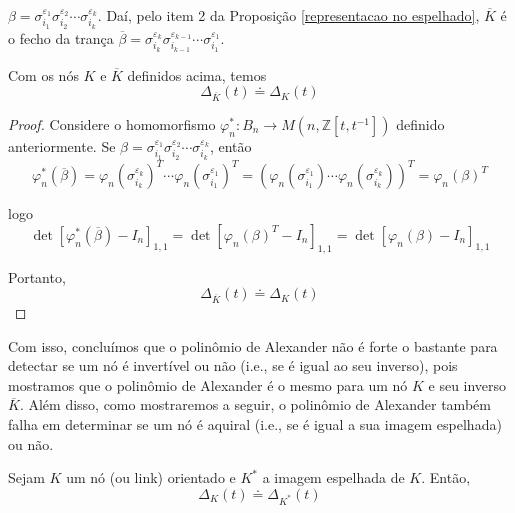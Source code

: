 	$\beta = \sigma_{i_1}^{\varepsilon_1}\sigma_{i_2}^{\varepsilon_2}\cdots\sigma_{i_k}^{\varepsilon_k}$. Daí, pelo item 2 da Proposição \eqref{representacao no espelhado}, $\overline{K}$ é o fecho da trança $\overline{\beta} = \sigma_{i_k}^{\varepsilon_k}\sigma_{i_{k-1}}^{\varepsilon_{k-1}}\cdots\sigma_{i_1}^{\varepsilon_1}$. 
	\begin{prop}
		\label{polinomio de Alexander para nos invertidos}
		Com os nós $K$ e $\overline{K}$ definidos acima, temos
		\begin{equation*}
		\Delta_{\overline{K}}(t) \doteq \Delta_K(t)
		\end{equation*}
	\end{prop}
	\begin{proof}
		Considere o homomorfismo $\varphi_n^\ast: B_n\to M(n, \mathbb{Z}[t,t^{-1}])$ definido anteriormente. Se $\beta=\sigma_{i_1}^{\varepsilon_1}\sigma_{i_2}^{\varepsilon_2}\cdots\sigma_{i_k}^{\varepsilon_k}$, então
		\begin{equation*}
		\varphi_n^\ast(\overline{\beta}) = \varphi_n(\sigma_{i_k}^{\varepsilon_k})^T\cdots\varphi_n(\sigma_{i_1}^{\varepsilon_1})^T = (\varphi_n(\sigma_{i_1}^{\varepsilon_1})\cdots\varphi_n(\sigma_{i_k}^{\varepsilon_k}))^T = \varphi_n(\beta)^T
		\end{equation*}
		
		\par\vspace{0.3cm} logo
		\begin{equation*}
		\det[\varphi_n^\ast(\overline{\beta}) - I_n]_{1,1} = \det[\varphi_n(\beta)^T - I_n]_{1,1} = \det[\varphi_n(\beta) - I_n]_{1,1}
		\end{equation*}
		\par\vspace{0.3cm} Portanto,
		\begin{equation*}
		\Delta_{\overline{K}}(t) \doteq \Delta_K(t)
		\end{equation*}
	\end{proof}
	\par\vspace{0.3cm} Com isso, concluímos que o polinômio de Alexander não é forte o bastante para detectar se um nó é invertível ou não (i.e., se é igual ao seu inverso), pois mostramos que o polinômio de Alexander é o mesmo para um nó $K$ e seu inverso $\overline{K}$. Além disso, como mostraremos a seguir, o polinômio de Alexander também falha em determinar se um nó é aquiral (i.e., se é igual a sua imagem espelhada) ou não. 
	\begin{prop}
		\label{polinomio de Alexander para nos espelhados}
		Sejam $K$ um nó (ou link) orientado e $K^\ast$ a imagem espelhada de $K$. Então,
		\begin{equation*}
		\Delta_K(t)\doteq\Delta_{K^\ast}(t)
		\end{equation*} 
	\end{prop}
